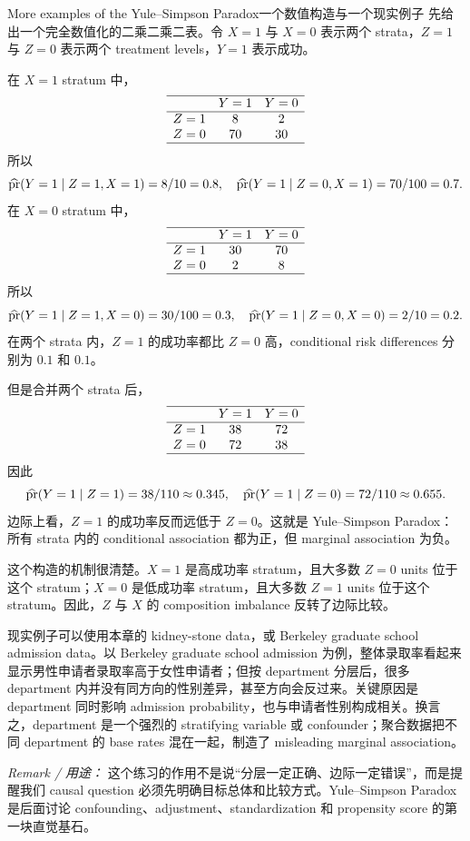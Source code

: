\begin{exercisesolution}{More examples of the Yule--Simpson Paradox}{一个数值构造与一个现实例子}
先给出一个完全数值化的二乘二乘二表。令 $X=1$ 与 $X=0$ 表示两个 strata，$Z=1$ 与 $Z=0$ 表示两个 treatment levels，$Y=1$ 表示成功。

在 $X=1$ stratum 中，
\[
\begin{array}{lcc}
\hline
&Y=1&Y=0\\ \hline
Z=1&8&2\\
Z=0&70&30\\
\hline
\end{array}
\]
所以
\[
\widehat{\textup{pr}}(Y=1\mid Z=1,X=1)=8/10=0.8,\quad
\widehat{\textup{pr}}(Y=1\mid Z=0,X=1)=70/100=0.7.
\]
在 $X=0$ stratum 中，
\[
\begin{array}{lcc}
\hline
&Y=1&Y=0\\ \hline
Z=1&30&70\\
Z=0&2&8\\
\hline
\end{array}
\]
所以
\[
\widehat{\textup{pr}}(Y=1\mid Z=1,X=0)=30/100=0.3,\quad
\widehat{\textup{pr}}(Y=1\mid Z=0,X=0)=2/10=0.2.
\]
在两个 strata 内，$Z=1$ 的成功率都比 $Z=0$ 高，conditional risk differences 分别为 $0.1$ 和 $0.1$。

但是合并两个 strata 后，
\[
\begin{array}{lcc}
\hline
&Y=1&Y=0\\ \hline
Z=1&38&72\\
Z=0&72&38\\
\hline
\end{array}
\]
因此
\[
\widehat{\textup{pr}}(Y=1\mid Z=1)=38/110\approx 0.345,\quad
\widehat{\textup{pr}}(Y=1\mid Z=0)=72/110\approx 0.655.
\]
边际上看，$Z=1$ 的成功率反而远低于 $Z=0$。这就是 Yule--Simpson Paradox：所有 strata 内的 conditional association 都为正，但 marginal association 为负。

这个构造的机制很清楚。$X=1$ 是高成功率 stratum，且大多数 $Z=0$ units 位于这个 stratum；$X=0$ 是低成功率 stratum，且大多数 $Z=1$ units 位于这个 stratum。因此，$Z$ 与 $X$ 的 composition imbalance 反转了边际比较。

现实例子可以使用本章的 kidney-stone data，或 Berkeley graduate school admission data。以 Berkeley graduate school admission 为例，整体录取率看起来显示男性申请者录取率高于女性申请者；但按 department 分层后，很多 department 内并没有同方向的性别差异，甚至方向会反过来。关键原因是 department 同时影响 admission probability，也与申请者性别构成相关。换言之，department 是一个强烈的 stratifying variable 或 confounder；聚合数据把不同 department 的 base rates 混在一起，制造了 misleading marginal association。

\emph{Remark / 用途：} 这个练习的作用不是说“分层一定正确、边际一定错误”，而是提醒我们 causal question 必须先明确目标总体和比较方式。Yule--Simpson Paradox 是后面讨论 confounding、adjustment、standardization 和 propensity score 的第一块直觉基石。
\end{exercisesolution}

